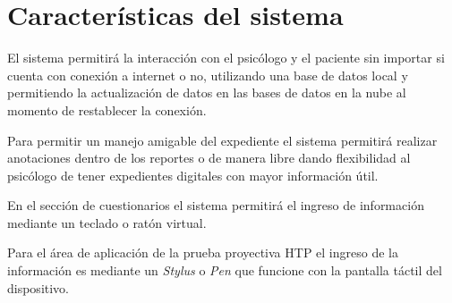 \section{Características del sistema}
El sistema permitirá la interacción con el psicólogo y el paciente sin importar si cuenta con conexión a internet o no, utilizando una base de datos local y permitiendo la actualización de datos en las bases de datos en la nube al momento de restablecer la conexión.

Para permitir un manejo amigable del expediente el sistema permitirá realizar anotaciones dentro de los reportes o de manera libre dando flexibilidad al psicólogo de tener expedientes digitales con mayor información útil.

En el sección de cuestionarios el sistema permitirá el ingreso de información mediante un teclado o ratón virtual.

Para el área de aplicación de la prueba proyectiva HTP el ingreso de la información es mediante un \textit{Stylus} o \textit{Pen} que funcione con la pantalla táctil del dispositivo.
\newline